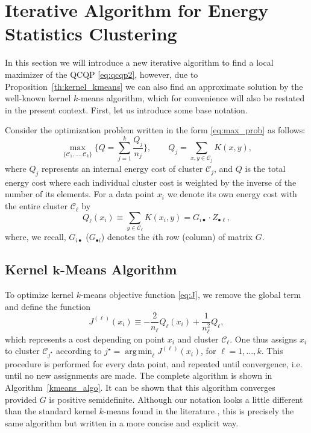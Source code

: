 \documentclass[aps,preprint,nofootinbib,floatfix]{revtex4-1}
\DeclareMathOperator*{\argmin}{arg\,min}
\newcommand\kk{K}
\newcommand\C{{\mathcal{C}}}
\begin{document}
\section{Iterative Algorithm for Energy Statistics Clustering}
\label{sec:algo}

In this section we will introduce a new iterative algorithm to find a local
maximizer of the QCQP \eqref{eq:qcqp2}, however, due to 
Proposition~\ref{th:kernel_kmeans} we can also find an approximate
solution by the well-known kernel $k$-means algorithm, which 
for convenience
will also be restated in the present context.
First, let us introduce some base notation.

Consider the optimization problem 
written in the form \eqref{eq:max_prob} as follows:
\begin{equation}
\label{eq:maxQ}
\max_{\{ \C_1,\dotsc,\C_k \}} 
\bigg\{ Q = \sum_{j=1}^k \dfrac{Q_j}{n_j}  \bigg\},
\qquad Q_j = \sum_{x,y\in\C_j} \kk(x,y),
\end{equation}
where $Q_j$ represents an internal energy cost of cluster $\C_j$, and
$Q$ is the total energy cost where each individual cluster cost 
is weighted by the inverse
of the number of its elements. For a data point $x_i$ we denote
its own energy cost
with the entire cluster $\C_\ell$ by
\begin{equation}
\label{eq:costxij}
Q_\ell(x_i) \equiv \sum_{y\in\C_\ell} \kk(x_i, y) = 
G_{i \bullet} \cdot Z_{\bullet \ell},
\end{equation}
where, we recall, $G_{i\bullet}$ ($G_{\bullet i}$) denotes
the $i$th row (column) of matrix $G$.

\subsection{Kernel $\bm{k}$-Means Algorithm}

To optimize kernel $k$-means objective function
\eqref{eq:J}, we remove the global term and define the function
\begin{equation}
\label{eq:Jell}
J^{(\ell)}(x_i) \equiv -\dfrac{2}{n_\ell} Q_\ell(x_i) + \dfrac{1}{n_\ell^2}
Q_\ell,
\end{equation}
which represents a cost depending on point $x_i$ and cluster $\C_\ell$. One
thus assigns  $x_i$ to cluster $\C_{j^\star}$ according
to $j^\star = \argmin_\ell J^{(\ell)}(x_i)$, for $\ell = 1,\dotsc,k$.
This procedure is performed for every data point, and repeated until
convergence, i.e. until no new assignments are made.
The complete algorithm is shown in Algorithm~\ref{kmeans_algo}.
It can be shown that this algorithm converges provided $G$ is positive
semidefinite.
Although our notation looks a little different than the standard
kernel $k$-means found in the literature \cite{Dhillon}, this is precisely
the same algorithm but written in a more concise and explicit way.
\end{document}
